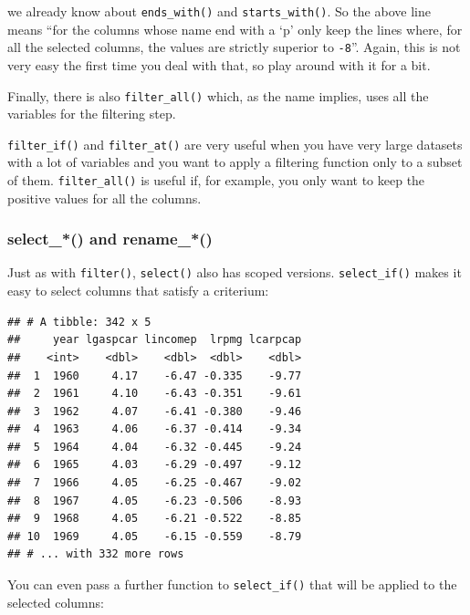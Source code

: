 \documentclass[]{gitbook}
\newenvironment{Shaded}{\begin{snugshade}}{\end{snugshade}}
\newcommand{\KeywordTok}[1]{\textcolor[rgb]{0.13,0.29,0.53}{\textbf{#1}}}
\newcommand{\NormalTok}[1]{#1}
\newcommand{\OperatorTok}[1]{\textcolor[rgb]{0.81,0.36,0.00}{\textbf{#1}}}
\newcommand{\StringTok}[1]{\textcolor[rgb]{0.31,0.60,0.02}{#1}}
\begin{document}
we already know about \texttt{ends\_with()} and \texttt{starts\_with()}. So the above line means ``for the columns
whose name end with a `p' only keep the lines where, for all the selected columns, the values are
strictly superior to \texttt{-8}''. Again, this is not very easy the first time you deal with that, so
play around with it for a bit.

Finally, there is also \texttt{filter\_all()} which, as the name implies, uses all the variables for
the filtering step.

\texttt{filter\_if()} and \texttt{filter\_at()} are very useful when you have very large datasets with a lot of
variables and you want to apply a filtering function only to a subset of them. \texttt{filter\_all()} is
useful if, for example, you only want to keep the positive values for all the columns.

\hypertarget{select_-and-rename_}{%
\subsubsection{select\_*() and rename\_*()}\label{select_-and-rename_}}

Just as with \texttt{filter()}, \texttt{select()} also has scoped versions. \texttt{select\_if()} makes it easy to
select columns that satisfy a criterium:

\begin{Shaded}
\end{Shaded}

\begin{verbatim}
## # A tibble: 342 x 5
##     year lgaspcar lincomep  lrpmg lcarpcap
##    <int>    <dbl>    <dbl>  <dbl>    <dbl>
##  1  1960     4.17    -6.47 -0.335    -9.77
##  2  1961     4.10    -6.43 -0.351    -9.61
##  3  1962     4.07    -6.41 -0.380    -9.46
##  4  1963     4.06    -6.37 -0.414    -9.34
##  5  1964     4.04    -6.32 -0.445    -9.24
##  6  1965     4.03    -6.29 -0.497    -9.12
##  7  1966     4.05    -6.25 -0.467    -9.02
##  8  1967     4.05    -6.23 -0.506    -8.93
##  9  1968     4.05    -6.21 -0.522    -8.85
## 10  1969     4.05    -6.15 -0.559    -8.79
## # ... with 332 more rows
\end{verbatim}

You can even pass a further function to \texttt{select\_if()} that will be applied to the selected columns:
\end{document}
